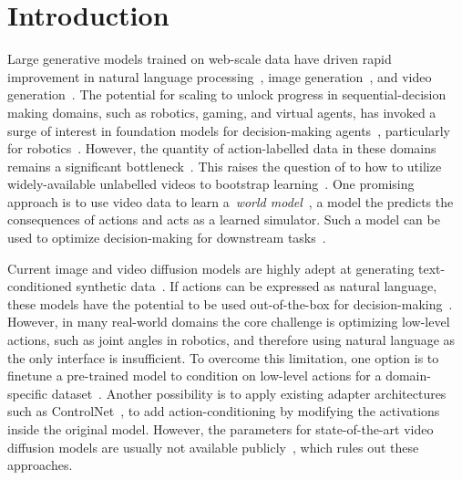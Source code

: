\section{Introduction}
Large generative models trained on web-scale data have driven rapid improvement in natural language processing~\citep{brown2020language, touvron2023llama, achiam2023gpt}, image generation~\citep{rombach2022high}, and video generation~\citep{sora}. 
%
The potential for scaling to unlock progress in sequential-decision making domains, such as robotics, gaming, and virtual agents, has invoked a surge of interest in foundation models for decision-making agents~\citep{reed2022generalist}, particularly for robotics~\citep{brohan2022rt, brohan2023rt}. However, the quantity of action-labelled data in these domains remains a significant bottleneck~\citep{padalkar2023open}. This raises  the question of to how to utilize widely-available unlabelled videos to bootstrap learning~\citep{baker2022video, bruce2024genie}. 
%
One promising approach is to use video data to learn a~\textit{world model}~\citep{ha2018world}, a model the predicts the consequences of actions and acts as a learned simulator.
%
Such a model can be used to optimize decision-making for downstream tasks~\citep{hafner2021mastering}.

%
Current image and video diffusion models are highly adept at generating text-conditioned synthetic data~\citep{podell2023sdxl, zhang2023i2vgen, blattmann2023stable}. If actions can be expressed as natural language, these models have the potential to be used out-of-the-box for decision-making~\citep{kapelyukh2023dall, zhu2024sora}.
%
However, in many real-world domains the core challenge is optimizing low-level actions, such as joint angles in robotics, and therefore using natural language as the only interface is insufficient.
%
To overcome this limitation, one option is to finetune a pre-trained model to condition on low-level actions for a domain-specific dataset~\citep{seo2022reinforcement}. 
%
Another possibility is to apply existing adapter architectures such as ControlNet~\citep{zhang2023adding}, to add action-conditioning by modifying the activations inside the original model.
%
However, the parameters for state-of-the-art video diffusion models are usually not available publicly~\citep{LumaAI, sora, runwaymlRunwayResearch}, which rules out these approaches.
%

